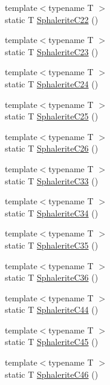 \begin{DoxyCompactItemize}
{\footnotesize template$<$typename T $>$ }\\static T \mbox{\hyperlink{namespacempc_1_1data_a2880bf365a0c13047e09f6f11c550ba9}{Sphalerite\+C22}} ()
\item 
{\footnotesize template$<$typename T $>$ }\\static T \mbox{\hyperlink{namespacempc_1_1data_aa705441ae21d0992816fc5c43783f5ad}{Sphalerite\+C23}} ()
\item 
{\footnotesize template$<$typename T $>$ }\\static T \mbox{\hyperlink{namespacempc_1_1data_a77a54876b1fce10bf027a5d9bf8b0a54}{Sphalerite\+C24}} ()
\item 
{\footnotesize template$<$typename T $>$ }\\static T \mbox{\hyperlink{namespacempc_1_1data_ae7d1c9b71b2ab7a0e7d9971990c64d83}{Sphalerite\+C25}} ()
\item 
{\footnotesize template$<$typename T $>$ }\\static T \mbox{\hyperlink{namespacempc_1_1data_ab2ee996bfbf376bc7b0b67a247c409a0}{Sphalerite\+C26}} ()
\item 
{\footnotesize template$<$typename T $>$ }\\static T \mbox{\hyperlink{namespacempc_1_1data_abedae6a40d778c87c4007e5f3dc518b7}{Sphalerite\+C33}} ()
\item 
{\footnotesize template$<$typename T $>$ }\\static T \mbox{\hyperlink{namespacempc_1_1data_afcf69c5d36c89b18b1465d54f28b648e}{Sphalerite\+C34}} ()
\item 
{\footnotesize template$<$typename T $>$ }\\static T \mbox{\hyperlink{namespacempc_1_1data_aa2576bc083b3212de07d691f4a7da4db}{Sphalerite\+C35}} ()
\item 
{\footnotesize template$<$typename T $>$ }\\static T \mbox{\hyperlink{namespacempc_1_1data_a10b24319fc3ffce14931390bdbd8327b}{Sphalerite\+C36}} ()
\item 
{\footnotesize template$<$typename T $>$ }\\static T \mbox{\hyperlink{namespacempc_1_1data_a2522db1c1e45aeeaca7239214508b27a}{Sphalerite\+C44}} ()
\item 
{\footnotesize template$<$typename T $>$ }\\static T \mbox{\hyperlink{namespacempc_1_1data_ab97943f217d9ec4c143b4b597faa7f73}{Sphalerite\+C45}} ()
\item 
{\footnotesize template$<$typename T $>$ }\\static T \mbox{\hyperlink{namespacempc_1_1data_a93db77fdf45791fd286daeb5cc22484b}{Sphalerite\+C46}} ()

\end{DoxyCompactItemize}
